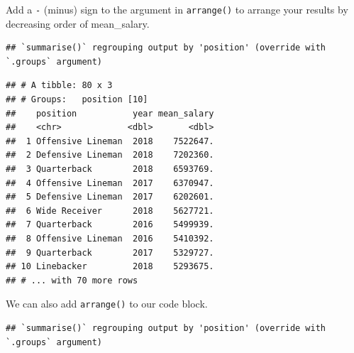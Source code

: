 \documentclass[
]{book}
\newenvironment{Shaded}{\begin{snugshade}}{\end{snugshade}}
\newcommand{\DataTypeTok}[1]{\textcolor[rgb]{0.13,0.29,0.53}{#1}}
\newcommand{\KeywordTok}[1]{\textcolor[rgb]{0.13,0.29,0.53}{\textbf{#1}}}
\newcommand{\NormalTok}[1]{#1}
\newcommand{\OperatorTok}[1]{\textcolor[rgb]{0.81,0.36,0.00}{\textbf{#1}}}
\newcommand{\StringTok}[1]{\textcolor[rgb]{0.31,0.60,0.02}{#1}}
\begin{document}
Add a \texttt{-} (minus) sign to the argument in \texttt{arrange()} to arrange your results by decreasing order of mean\_salary.

\begin{Shaded}
\end{Shaded}

\begin{verbatim}
## `summarise()` regrouping output by 'position' (override with `.groups` argument)
\end{verbatim}

\begin{verbatim}
## # A tibble: 80 x 3
## # Groups:   position [10]
##    position           year mean_salary
##    <chr>             <dbl>       <dbl>
##  1 Offensive Lineman  2018    7522647.
##  2 Defensive Lineman  2018    7202360.
##  3 Quarterback        2018    6593769.
##  4 Offensive Lineman  2017    6370947.
##  5 Defensive Lineman  2017    6202601.
##  6 Wide Receiver      2018    5627721.
##  7 Quarterback        2016    5499939.
##  8 Offensive Lineman  2016    5410392.
##  9 Quarterback        2017    5329727.
## 10 Linebacker         2018    5293675.
## # ... with 70 more rows
\end{verbatim}

We can also add \texttt{arrange()} to our code block.

\begin{Shaded}
\end{Shaded}

\begin{verbatim}
## `summarise()` regrouping output by 'position' (override with `.groups` argument)
\end{verbatim}
\end{document}
